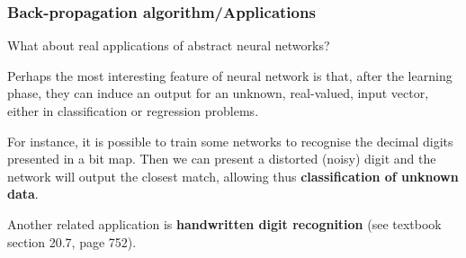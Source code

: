 %
\begin{frame}
\frametitle{Back-propagation algorithm/Applications}

What about real applications of abstract neural networks?

\bigskip

Perhaps the most interesting feature of neural network is that, after
the learning phase, they can induce an output for an unknown,
real-valued, input vector, either in classification or regression
problems.

\bigskip

For instance, it is possible to train some networks to recognise the
decimal digits presented in a bit map. Then we can present a distorted
(noisy) digit and the network will output the closest match, allowing
thus \textbf{classification of unknown data}.

\bigskip

Another related application is \textbf{handwritten digit recognition}
(see textbook section 20.7, page 752).

\end{frame}
